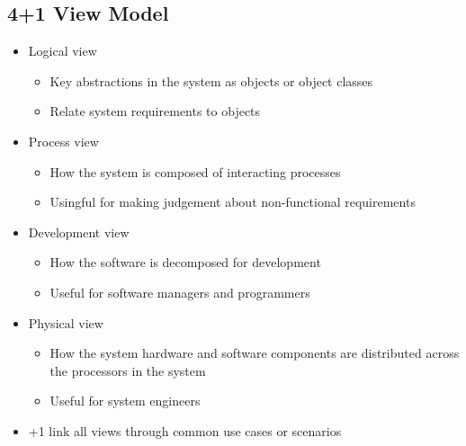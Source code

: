 \documentclass{article}
\begin{document}

    \subsection*{4+1 View Model}

    \begin{itemize}
        \item Logical view 
        \begin{itemize}
            \item Key abstractions in the system as objects or object classes
            \item Relate system requirements to objects
        \end{itemize}
        \item Process view 
        \begin{itemize}
            \item How the system is composed of interacting processes
            \item Usingful for making judgement about non-functional requirements 
        \end{itemize}
        \item Development view 
        \begin{itemize}
            \item How the software is decomposed for development 
            \item Useful for software managers and programmers 
        \end{itemize}
        \item Physical view 
        \begin{itemize}
            \item How the system hardware and software components are distributed across 
            the processors in the system 
            \item Useful for system engineers 
        \end{itemize}
        \item +1 link all views through common use cases or scenarios 
    \end{itemize}

\end{document}
